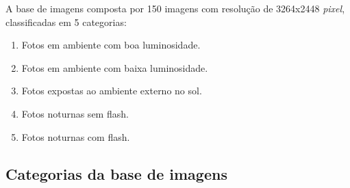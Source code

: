 A base de imagens composta por 150 imagens com resolução de 3264x2448 \textit{pixel}, classificadas em 5 categorias: 

  \begin{enumerate}
   \item Fotos em ambiente com boa luminosidade.
   \item Fotos em ambiente com baixa luminosidade.
   \item Fotos expostas ao ambiente externo no sol.
   \item Fotos noturnas sem flash.
   \item Fotos noturnas com flash.
 \end{enumerate}
 
\subsection{Categorias da base de imagens}

